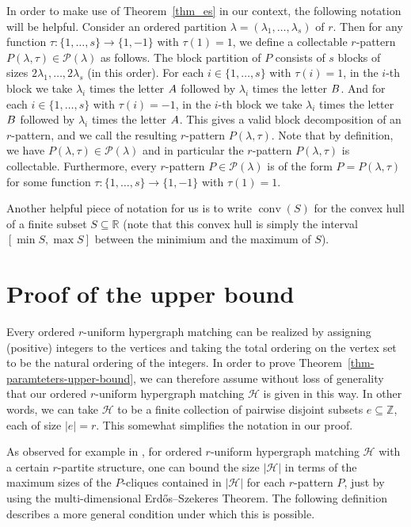 \documentclass[11pt]{article}
\theoremstyle{definition}
\numberwithin{equation}{section}
\numberwithin{figure}{section}
\newcommand{\su}{\subseteq}
\newcommand{\Z}{\mathbb{Z}}
\newcommand{\HH}{\mathcal{H}}
\newcommand{\conv}{\operatorname{conv}}
\newcommand{\PP}{\mathcal{P}}
\begin{document}
In order to make use of Theorem~\ref{thm_es} in our context, the following notation will be helpful. Consider an ordered partition $\lambda=(\lambda_1,\dots,\lambda_s)$ of $r$. Then for any function $\tau:\{1,\dots,s\}\to \{1,-1\}$ with $\tau(1)=1$, we define a collectable $r$-pattern $P(\lambda,\tau)\in \PP(\lambda)$ as follows. The block partition of $P$ consists of $s$ blocks of sizes $2\lambda_1,\dots,2\lambda_s$ (in this order). For each $i\in\{1,\dots,s\}$ with $\tau(i)=1$, in the $i$-th block we take $\lambda_i$ times the letter $\rm A$ followed by $\lambda_i$ times the letter $\rm B$. And for each $i\in\{1,\dots,s\}$ with $\tau(i)=-1$, in the $i$-th block we take $\lambda_i$ times the letter $\rm B$ followed by $\lambda_i$ times the letter $\rm A$. This gives a valid block decomposition of an $r$-pattern, and we call the resulting $r$-pattern $P(\lambda,\tau)$. Note that by definition, we have $P(\lambda,\tau)\in \PP(\lambda)$ and in particular the $r$-pattern $P(\lambda,\tau)$ is collectable. Furthermore, every $r$-pattern $P\in \PP(\lambda)$ is of the form $P=P(\lambda,\tau)$ for some function $\tau:\{1,\dots,s\}\to \{1,-1\}$ with $\tau(1)=1$.

Another helpful piece of notation for us is to write $\conv(S)$ for the convex hull of a finite subset $S\su \mathbb{R}$ (note that this convex hull is simply the interval $[\min S,\max S]$ between the minimium and the maximum of $S$).


\section{Proof of the upper bound}
\label{sect-upper-bound}

Every ordered $r$-uniform hypergraph matching can be realized by assigning (positive) integers to the vertices and taking the total ordering on the vertex set to be the natural ordering of the integers. In order to prove Theorem~\ref{thm-paramteters-upper-bound}, we can therefore assume without loss of generality that our ordered $r$-uniform hypergraph matching $\HH$ is given in this way. In other words, we can take $\HH$ to be a finite collection of pairwise disjoint subsets $e\su \Z$, each of size $|e|=r$. This somewhat simplifies the notation in our proof.

As observed for example in \cite{AJKS}, for ordered $r$-uniform hypergraph matching $\HH$ with a certain $r$-partite structure, one can bound the size $|\HH|$ in terms of the maximum sizes of the $P$-cliques contained in $|\HH|$ for each $r$-pattern $P$, just by using the multi-dimensional Erd\H{o}s--Szekeres Theorem. The following definition describes a more general condition under which this is possible.
\end{document}
